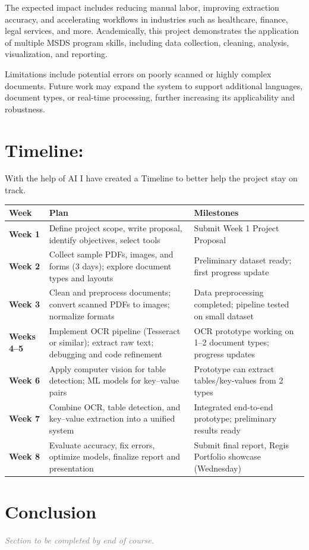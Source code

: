 \documentclass[12pt, onecolumn]{IEEEtran}
\begin{document}
The expected impact includes reducing manual labor, improving extraction accuracy, and accelerating workflows in industries such as healthcare, finance, legal services, and more. Academically, this project demonstrates the application of multiple MSDS program skills, including data collection, cleaning, analysis, visualization, and reporting.

Limitations include potential errors on poorly scanned or highly complex documents. Future work may expand the system to support additional languages, document types, or real-time processing, further increasing its applicability and robustness.

\section{\textbf{Timeline:}}
With the help of AI I have created a Timeline to better help the project stay on track.



\begin{table}[h]
\renewcommand{\arraystretch}{1.4}
\centering
\begin{tabularx}{\textwidth}{@{} l X X @{}}
\toprule
\textbf{Week} & \textbf{Plan} & \textbf{Milestones} \\ \midrule
\textbf{Week 1} & Define project scope, write proposal, identify objectives, select tools & Submit Week 1 Project Proposal \\
\textbf{Week 2} & Collect sample PDFs, images, and forms (3 days); explore document types and layouts & Preliminary dataset ready; first progress update \\
\textbf{Week 3} & Clean and preprocess documents; convert scanned PDFs to images; normalize formats & Data preprocessing completed; pipeline tested on small dataset \\
\textbf{Weeks 4–5} & Implement OCR pipeline (Tesseract or similar); extract raw text; debugging and code refinement & OCR prototype working on 1–2 document types; progress updates \\
\textbf{Week 6} & Apply computer vision for table detection; ML models for key–value pairs & Prototype can extract tables/key-values from 2 types \\
\textbf{Week 7} & Combine OCR, table detection, and key–value extraction into a unified system & Integrated end-to-end prototype; preliminary results ready \\
\textbf{Week 8} & Evaluate accuracy, fix errors, optimize models, finalize report and presentation & Submit final report, Regis Portfolio showcase (Wednesday) \\ \bottomrule
\end{tabularx}
\end{table}

\section{\textbf{Conclusion}}
\textcolor{gray}{\textit{Section to be completed by end of course.}}



\end{document}
